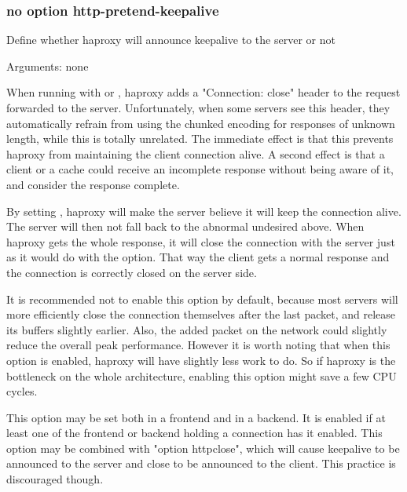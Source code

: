 \subsubsection*{no option http-pretend-keepalive}


  Define whether haproxy will announce keepalive to the server or not


  Arguments: none

  When running with  or , haproxy
  adds a "Connection: close" header to the request forwarded to the server.
  Unfortunately, when some servers see this header, they automatically refrain
  from using the chunked encoding for responses of unknown length, while this
  is totally unrelated. The immediate effect is that this prevents haproxy from
  maintaining the client connection alive. A second effect is that a client or
  a cache could receive an incomplete response without being aware of it, and
  consider the response complete.

  By setting , haproxy will make the server
  believe it will keep the connection alive. The server will then not fall back
  to the abnormal undesired above. When haproxy gets the whole response, it
  will close the connection with the server just as it would do with the
   option. That way the client gets a normal response and the
  connection is correctly closed on the server side.

  It is recommended not to enable this option by default, because most servers
  will more efficiently close the connection themselves after the last packet,
  and release its buffers slightly earlier. Also, the added packet on the
  network could slightly reduce the overall peak performance. However it is
  worth noting that when this option is enabled, haproxy will have slightly
  less work to do. So if haproxy is the bottleneck on the whole architecture,
  enabling this option might save a few CPU cycles.

  This option may be set both in a frontend and in a backend. It is enabled if
  at least one of the frontend or backend holding a connection has it enabled.
  This option may be combined with "option httpclose", which will cause
  keepalive to be announced to the server and close to be announced to the
  client. This practice is discouraged though.

